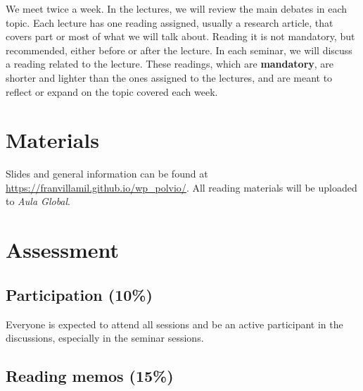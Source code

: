 \documentclass[12pt, a4paper]{article}
\begin{document}
We meet twice a week. In the lectures, we will review the main debates in each topic. Each lecture has one reading assigned, usually a research article, that covers part or most of what we will talk about. Reading it is not mandatory, but recommended, either before or after the lecture. In each seminar, we will discuss a reading related to the lecture. These readings, which are \textbf{mandatory}, are shorter and lighter than the ones assigned to the lectures, and are meant to reflect or expand on the topic covered each week.

\section{Materials}

Slides and general information can be found at \href{https://franvillamil.github.io/wp_polvio/}{https://franvillamil.github.io/wp\_polvio/}. All reading materials will be uploaded to \textit{Aula Global}.

\newpage
\section{Assessment}


\subsection{Participation (10\%)}

Everyone is expected to attend all sessions and be an active participant in the discussions, especially in the seminar sessions.

\subsection{Reading memos (15\%)}
%
%
\end{document}
